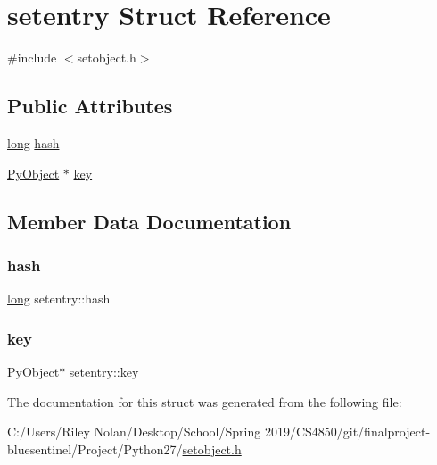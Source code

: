\hypertarget{structsetentry}{}\section{setentry Struct Reference}
\label{structsetentry}


{\ttfamily \#include $<$setobject.\+h$>$}

\subsection*{Public Attributes}
\begin{DoxyCompactItemize}
\item 
\mbox{\hyperlink{modsupport_8h_a0cb68e00fb9fb1260ee2daadd9fe6611}{long}} \mbox{\hyperlink{structsetentry_ae6624938722ad1fe4673208153c13585}{hash}}
\item 
\mbox{\hyperlink{_python27_2object_8h_aadc84ac7aed2cfa6f20c25f62bf3dac7}{Py\+Object}} $\ast$ \mbox{\hyperlink{structsetentry_a1825321554c31751882b7f447dbb2a28}{key}}
\end{DoxyCompactItemize}


\subsection{Member Data Documentation}
\mbox{\label{structsetentry_ae6624938722ad1fe4673208153c13585}} 
\subsubsection{\texorpdfstring{hash}{hash}}
{\footnotesize\ttfamily \mbox{\hyperlink{modsupport_8h_a0cb68e00fb9fb1260ee2daadd9fe6611}{long}} setentry\+::hash}

\mbox{\label{structsetentry_a1825321554c31751882b7f447dbb2a28}} 
\subsubsection{\texorpdfstring{key}{key}}
{\footnotesize\ttfamily \mbox{\hyperlink{_python27_2object_8h_aadc84ac7aed2cfa6f20c25f62bf3dac7}{Py\+Object}}$\ast$ setentry\+::key}



The documentation for this struct was generated from the following file\+:\begin{DoxyCompactItemize}
\item 
C\+:/\+Users/\+Riley Nolan/\+Desktop/\+School/\+Spring 2019/\+C\+S4850/git/finalproject-\/bluesentinel/\+Project/\+Python27/\mbox{\hyperlink{setobject_8h}{setobject.\+h}}\end{DoxyCompactItemize}
